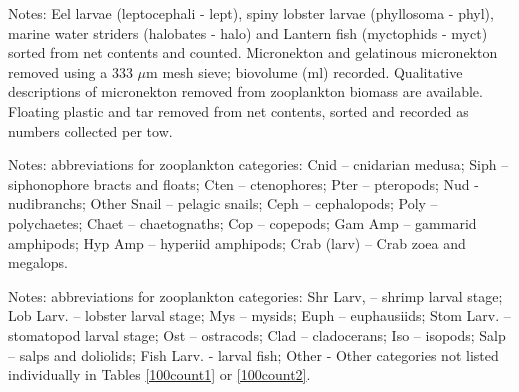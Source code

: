 \documentclass[letterpaper,11pt]{article}
\newcommand{\cruiseID}{S275}
\begin{document}
\begin{landscape}
\clearpage

\noindent Notes: Eel larvae (leptocephali - lept), spiny lobster larvae (phyllosoma - phyl), marine water striders (halobates - halo) and Lantern fish (myctophids - myct) sorted from net contents and counted. Micronekton and gelatinous micronekton removed using a 333 $\mu$m mesh sieve; biovolume (ml) recorded. Qualitative descriptions of micronekton removed from zooplankton biomass are available. Floating plastic and tar removed from net contents, sorted and recorded as numbers collected per tow.

\clearpage

\noindent Notes: abbreviations for zooplankton categories: Cnid – cnidarian medusa; Siph – siphonophore bracts and floats; Cten – ctenophores; Pter – pteropods; Nud - nudibranchs; Other Snail – pelagic snails; Ceph – cephalopods; Poly – polychaetes; Chaet – chaetognaths; Cop – copepods; Gam Amp – gammarid amphipods; Hyp Amp – hyperiid amphipods; Crab (larv) – Crab zoea and megalops.

\clearpage

\noindent Notes: abbreviations for zooplankton categories: Shr Larv, – shrimp larval stage; Lob Larv. – lobster larval stage; Mys – mysids; Euph – euphausiids; Stom Larv. – stomatopod larval stage; Ost – ostracods; Clad – cladocerans; Iso – isopods; Salp – salps and doliolids; Fish Larv. - larval fish; Other - Other categories not listed individually in Tables \ref{100count1} or \ref{100count2}.



\end{landscape}
\end{document}
